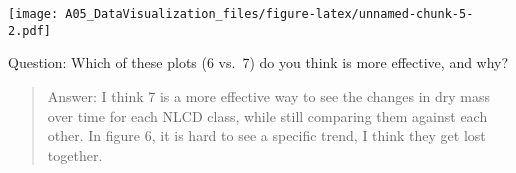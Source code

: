 \documentclass[]{article}
\begin{document}
\texttt{[image: A05\_DataVisualization\_files/figure-latex/unnamed-chunk-5-2.pdf]}

Question: Which of these plots (6 vs.~7) do you think is more effective,
and why?

\begin{quote}
Answer: I think 7 is a more effective way to see the changes in dry mass
over time for each NLCD class, while still comparing them against each
other. In figure 6, it is hard to see a specific trend, I think they get
lost together.
\end{quote}
\end{document}
